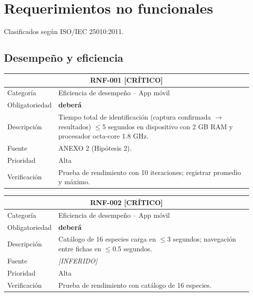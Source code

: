 \documentclass[12pt, a4paper]{article}
\newcommand{\criticomark}{\textcolor{criticolor}{\textbf{[CR\'ITICO]}}}
\newcommand{\inferido}{\textcolor{medio}{\textit{[INFERIDO]}}}
\begin{document}
\section{Requerimientos no funcionales}

Clasificados seg\'un ISO/IEC 25010:2011.

\subsection{Desempe\~no y eficiencia}

\begin{longtable}{|p{3cm}|p{11.5cm}|}
\hline
\multicolumn{2}{|c|}{\textbf{RNF-001} \criticomark} \\
\hline
Categor\'ia & Eficiencia de desempe\~no -- App m\'ovil \\
\hline
Obligatoriedad & \textbf{deber\'a} \\
\hline
Descripci\'on & Tiempo total de identificaci\'on (captura confirmada $\rightarrow$ resultados) $\leq$5 segundos en dispositivo con 2 GB RAM y procesador octa-core 1.8 GHz. \\
\hline
Fuente & ANEXO 2 (Hip\'otesis 2). \\
\hline
Prioridad & Alta \\
\hline
Verificaci\'on & Prueba de rendimiento con 10 iteraciones; registrar promedio y m\'aximo. \\
\hline
\end{longtable}

\begin{longtable}{|p{3cm}|p{11.5cm}|}
\hline
\multicolumn{2}{|c|}{\textbf{RNF-002} \criticomark} \\
\hline
Categor\'ia & Eficiencia de desempe\~no -- App m\'ovil \\
\hline
Obligatoriedad & \textbf{deber\'a} \\
\hline
Descripci\'on & Cat\'alogo de 16 especies carga en $\leq$3 segundos; navegaci\'on entre fichas en $\leq$0.5 segundos. \\
\hline
Fuente & \inferido{} \\
\hline
Prioridad & Alta \\
\hline
Verificaci\'on & Prueba de rendimiento con cat\'alogo de 16 especies. \\
\hline
\end{longtable}
\end{document}
